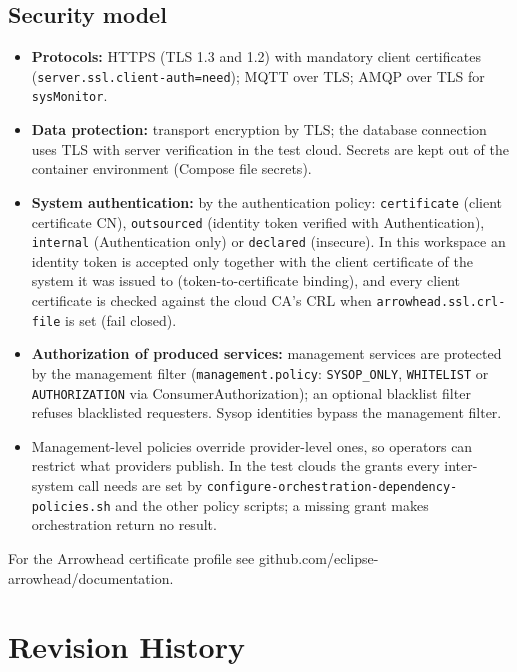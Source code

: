 \documentclass[a4paper]{arrowhead}
\begin{document}
\subsection{Security model}

\begin{itemize}
  \item \textbf{Protocols:} HTTPS (TLS 1.3 and 1.2) with mandatory client certificates (\texttt{server.ssl.client-auth=need}); MQTT over TLS; AMQP over TLS for \texttt{sysMonitor}.
  \item \textbf{Data protection:} transport encryption by TLS; the database connection uses TLS with server verification in the test cloud. Secrets are kept out of the container environment (Compose file secrets).
  \item \textbf{System authentication:} by the authentication policy: \texttt{certificate} (client certificate CN), \texttt{outsourced} (identity token verified with Authentication), \texttt{internal} (Authentication only) or \texttt{declared} (insecure). In this workspace an identity token is accepted only together with the client certificate of the system it was issued to (token-to-certificate binding), and every client certificate is checked against the cloud CA's CRL when \texttt{arrowhead.ssl.crl-file} is set (fail closed).
  \item \textbf{Authorization of produced services:} management services are protected by the management filter (\texttt{management.policy}: \texttt{SYSOP\_ONLY}, \texttt{WHITELIST} or \texttt{AUTHORIZATION} via ConsumerAuthorization); an optional blacklist filter refuses blacklisted requesters. Sysop identities bypass the management filter.
  \item Management-level policies override provider-level ones, so operators can restrict what providers publish. In the test clouds the grants every inter-system call needs are set by \texttt{configure-\allowbreak{}orchestration-\allowbreak{}dependency-\allowbreak{}policies.\allowbreak{}sh} and the other policy scripts; a missing grant makes orchestration return no result.
\end{itemize}

For the Arrowhead certificate profile see github.com/eclipse-arrowhead/documentation.





\newpage

\section{Revision History}
\end{document}
